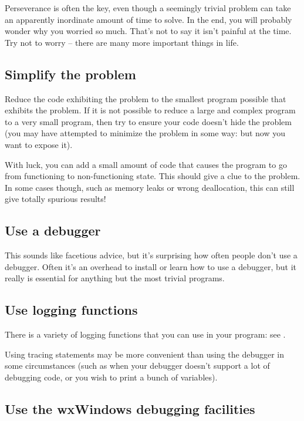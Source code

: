 Perseverance is often the key, even though a seemingly trivial problem
can take an apparently inordinate amount of time to solve. In the end,
you will probably wonder why you worried so much. That's not to say it
isn't painful at the time. Try not to worry -- there are many more important
things in life.

\subsection{Simplify the problem}

Reduce the code exhibiting the problem to the smallest program possible
that exhibits the problem. If it is not possible to reduce a large and
complex program to a very small program, then try to ensure your code
doesn't hide the problem (you may have attempted to minimize the problem
in some way: but now you want to expose it).

With luck, you can add a small amount of code that causes the program
to go from functioning to non-functioning state. This should give a clue
to the problem. In some cases though, such as memory leaks or wrong
deallocation, this can still give totally spurious results!

\subsection{Use a debugger}

This sounds like facetious advice, but it's surprising how often people
don't use a debugger. Often it's an overhead to install or learn how to
use a debugger, but it really is essential for anything but the most
trivial programs.

\subsection{Use logging functions}

There is a variety of logging functions that you can use in your program:
see .

Using tracing statements may be more convenient than using the debugger
in some circumstances (such as when your debugger doesn't support a lot
of debugging code, or you wish to print a bunch of variables).

\subsection{Use the wxWindows debugging facilities}

